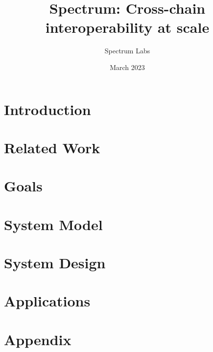 \documentclass{article}
\title{Spectrum: Cross-chain interoperability at scale}
\author{Spectrum Labs}
\date{March 2023}
\begin{document}
    \begin{sloppypar}
        \maketitle


        \section{Introduction}\label{sec:introduction}
        


        \section{Related Work}\label{sec:related-work}
        


        \section{Goals}\label{sec:goals}
        


        \section{System Model}\label{sec:system-model}
        


        \section{System Design}\label{sec:system-design}
        


        \section{Applications}\label{sec:applications}
        


        \section{Appendix}\label{sec:appendix}

        \newpage
        \printbibliography

        

    \end{sloppypar}
\end{document}
